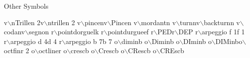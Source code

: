 \debutmorceau\Notes\sk\relax
{}\qqs\sk{}\hs\sk\relax
{}\qs\sk\sk\relax
{}\ds\sk{}\qp\sk\relax
{}\hpause\sk{}\pause\sk\relax
{}\PAuse\sk{}\PAUSe\enotes\suspmorceau
\bigskip\centerline{\moyen Other Symbols}\bigskip
\def\mcra#1{\zch v{$\backslash$#1}}\relax
\debutmorceau\NOtes\sk\relax
\mcra{nTrille}\nTrille n 2\sk\mcra{ntrille}\ntrille n 2\sk\sk\relax
\mcra{pince}\pince n\sk\mcra{Pince}\Pince n\sk\relax
\mcra{mordant}\mordant n\sk\sk\relax
\mcra{turn}\turn n\sk\mcra{backturn}\backturn n\sk\sk\relax
\mcra{coda}\coda n\sk\mcra{segno}\segno n\sk\enotes\relax
\def\mcra#1{\zch r{$\backslash$#1}}\alaligne\NOtes\sk\relax
\mcra{pointdorgue}\pointdorgue l\wh k\sk\relax
\mcra{pointdurgue}\pointdurgue e\wh f\sk\relax
\mcra{PED}\PED\sk\mcra{DEP}\DEP\sk\relax
\mcra{arpeggio f 1}\arpeggio f 1\sk\sk\relax
\mcra{arpeggio d 4}\arpeggio d 4\sk\sk\relax
\mcra{arpeggio b 7}\arpeggio b 7\sk\enotes\relax
\def\mcra#1{\zch o{$\backslash$#1}}\alaligne\NOtes\sk\sk\relax
\mcra{dimin}\zcharnote b{\dimin}\sk\relax
\mcra{Dimin}\zcharnote b{\Dimin}\sk\sk\relax
\mcra{DImin}\zcharnote b{\DImin}\sk\sk\sk\relax
\mcra{DIMin}\zcharnote b{\DIMin}\sk\sk\sk\mcra{octfin}\octfin r 2\sk\sk\relax
\enotes\alaligne\NOtes\mcra{octline}\octline r\sk\sk\relax
\mcra{cresc}\zcharnote b{\cresc}\sk\relax
\mcra{Cresc}\zcharnote b{\Cresc}\sk\sk\relax
\mcra{CResc}\zcharnote b{\CResc}\sk\sk\sk\relax
\mcra{CREsc}\zcharnote b{\CREsc}\sk\sk\sk\sk\sk\relax
\enotes\suspmorceau\bye
